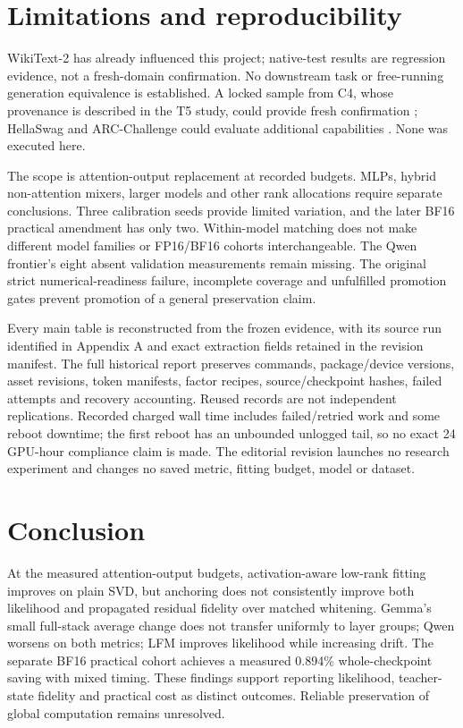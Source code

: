 \documentclass[10pt]{article}
\begin{document}
\section{Limitations and reproducibility}

WikiText-2 has already influenced this project; native-test results are regression evidence, not a fresh-domain confirmation. No downstream task or free-running generation equivalence is established. A locked sample from C4, whose provenance is described in the T5 study, could provide fresh confirmation \cite{raffel2020t5}; HellaSwag and ARC-Challenge could evaluate additional capabilities \cite{zellers2019hellaswag} \cite{clark2018arc}. None was executed here.

The scope is attention-output replacement at recorded budgets. MLPs, hybrid non-attention mixers, larger models and other rank allocations require separate conclusions. Three calibration seeds provide limited variation, and the later BF16 practical amendment has only two. Within-model matching does not make different model families or FP16/BF16 cohorts interchangeable. The Qwen frontier's eight absent validation measurements remain missing. The original strict numerical-readiness failure, incomplete coverage and unfulfilled promotion gates prevent promotion of a general preservation claim.

Every main table is reconstructed from the frozen evidence, with its source run identified in Appendix A and exact extraction fields retained in the revision manifest. The full historical report preserves commands, package/device versions, asset revisions, token manifests, factor recipes, source/checkpoint hashes, failed attempts and recovery accounting. Reused records are not independent replications. Recorded charged wall time includes failed/retried work and some reboot downtime; the first reboot has an unbounded unlogged tail, so no exact 24 GPU-hour compliance claim is made. The editorial revision launches no research experiment and changes no saved metric, fitting budget, model or dataset.

\section{Conclusion}

At the measured attention-output budgets, activation-aware low-rank fitting improves on plain SVD, but anchoring does not consistently improve both likelihood and propagated residual fidelity over matched whitening. Gemma's small full-stack average change does not transfer uniformly to layer groups; Qwen worsens on both metrics; LFM improves likelihood while increasing drift. The separate BF16 practical cohort achieves a measured 0.894\% whole-checkpoint saving with mixed timing. These findings support reporting likelihood, teacher-state fidelity and practical cost as distinct outcomes. Reliable preservation of global computation remains unresolved.
\end{document}
